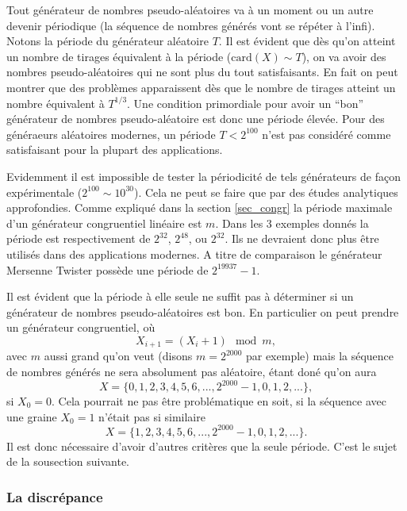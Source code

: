 \documentclass[a4paper,12pt]{book}
\newcommand{\card}{\mathrm{card}}
\begin{document}
Tout générateur de nombres pseudo-aléatoires va à un moment ou un autre devenir périodique (la séquence de nombres générés vont 
se répéter à l'infi). Notons la période du générateur aléatoire $T$. 
Il est évident que dès qu'on atteint un nombre de tirages équivalent à la période ($\card(X)\sim T$), on va avoir des nombres 
pseudo-aléatoires qui ne sont plus du tout satisfaisants. En fait on peut montrer que des problèmes apparaissent dès que
le nombre de tirages atteint un nombre équivalent à $T^{1/3}$. 
Une condition primordiale pour avoir un ``bon'' générateur de nombres pseudo-aléatoire est donc une période élevée.
Pour des généraeurs aléatoires modernes, 
un période $T<2^{100}$ n'est pas considéré comme satisfaisant pour la plupart des applications.

Evidemment il est impossible de tester la périodicité de tels générateurs de façon 
expérimentale ($2^{100}\sim 10^{30}$). Cela ne peut se faire que par des études analytiques
approfondies. Comme expliqué dans la section \ref{sec_congr}
la période maximale d'un générateur congruentiel linéaire est $m$. Dans les 3 exemples
donnés la période est respectivement de $2^{32}$, $2^{48}$, ou $2^{32}$. Ils ne devraient donc
plus être utilisés dans des applications modernes. A titre de comparaison le générateur Mersenne Twister possède une période de $2^{19937}-1$.

Il est évident que la période à elle seule ne suffit pas à déterminer si un 
générateur de nombres pseudo-aléatoires est bon. En particulier on peut prendre un générateur congruentiel, où 
\begin{equation}
 X_{i+1}=(X_i+1)\mod m,
\end{equation}
avec $m$ aussi grand qu'on veut (disons $m=2^{2000}$ par exemple) mais la séquence de
nombres générés ne sera absolument pas aléatoire, étant doné qu'on aura
\begin{equation}
 X=\{0, 1, 2, 3, 4, 5, 6, ..., 2^{2000}-1, 0, 1, 2, ...\},
\end{equation}
si $X_0=0$. Cela pourrait ne pas être problématique en soit, si la séquence avec une graine $X_0=1$ n'était pas si similaire
\begin{equation}
 X=\{1, 2, 3, 4, 5, 6, ..., 2^{2000}-1, 0, 1, 2, ...\}.
\end{equation}
Il est donc nécessaire d'avoir d'autres critères que la seule période.
C'est le sujet de la sousection suivante.

\subsubsection{La discrépance}
\end{document}

